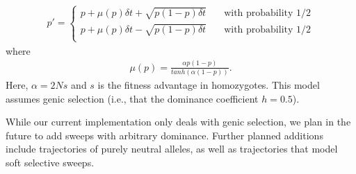 \documentclass{article}
\begin{document}
\begin{eqnarray*}
	p'=\left\{ \begin{array}{ll}
	    p + \mu(p)\delta t +\sqrt{p(1-p)\delta t} & \quad \mbox{with probability $1/2$}\\
	    p + \mu(p)\delta t -\sqrt{p(1-p)\delta t} & \quad \mbox{with probability $1/2$}\\
	\end{array} \right.
\end{eqnarray*}
where
\begin{eqnarray*}
	\mu(p)=\frac{\alpha p (1 - p)}{tanh(\alpha(1-p))}.
\end{eqnarray*}
Here, $\alpha=2Ns$ and $s$ is the fitness advantage in homozygotes. This model
assumes genic selection (i.e., that the dominance coefficient $h=0.5$).

While our current implementation only deals with genic selection,
we plan in the future to add sweeps with arbitrary dominance. Further planned
additions include trajectories of purely neutral alleles, as well as trajectories
that model soft selective sweeps.
\end{document}

